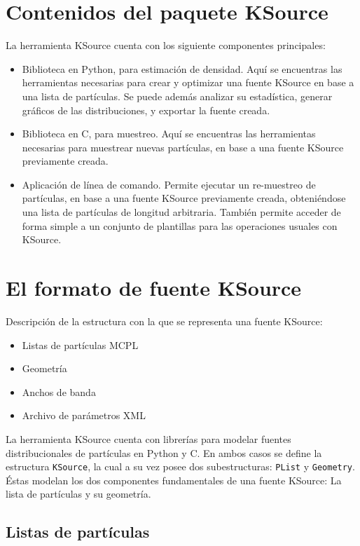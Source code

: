\section{Contenidos del paquete KSource}

La herramienta KSource cuenta con los siguiente componentes principales:
\begin{itemize}
	\item Biblioteca en Python, para estimación de densidad. Aquí se encuentras las herramientas necesarias para crear y optimizar una fuente KSource en base a una lista de partículas. Se puede además analizar su estadística, generar gráficos de las distribuciones, y exportar la fuente creada.
	\item Biblioteca en C, para muestreo. Aquí se encuentras las herramientas necesarias para muestrear nuevas partículas, en base a una fuente KSource previamente creada.
	\item Aplicación de línea de comando. Permite ejecutar un re-muestreo de partículas, en base a una fuente KSource previamente creada, obteniéndose una lista de partículas de longitud arbitraria. También permite acceder de forma simple a un conjunto de plantillas para las operaciones usuales con KSource.
\end{itemize}


\section{El formato de fuente KSource}

Descripción de la estructura con la que se representa una fuente KSource:
\begin{itemize}
	\item Listas de partículas MCPL
	\item Geometría
	\item Anchos de banda
	\item Archivo de parámetros XML
\end{itemize}

La herramienta KSource cuenta con librerías para modelar fuentes distribucionales de partículas en Python y C. En ambos casos se define la estructura \verb|KSource|, la cual a su vez posee dos subestructuras: \verb|PList| y \verb|Geometry|. Éstas modelan los dos componentes fundamentales de una fuente KSource: La lista de partículas y su geometría.

\subsection{Listas de partículas}

